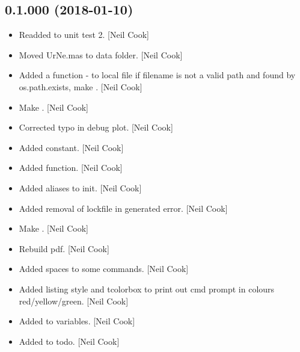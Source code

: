 \documentclass[a4paper,10pt,english]{report}
\begin{document}
\subsection{0.1.000 (2018-01-10)}
\label{\detokenize{misc/changelog:id504}}\begin{itemize}
\item {} 
Readded  to unit test 2. {[}Neil Cook{]}

\item {} 
Moved UrNe.mas to data folder. {[}Neil Cook{]}

\item {} 
Added a  function - to local file if filename is not a
valid path and found by os.path.exists, make  .
{[}Neil Cook{]}

\item {} 
Make  . {[}Neil Cook{]}

\item {} 
Corrected typo in debug plot. {[}Neil Cook{]}

\item {} 
Added  constant. {[}Neil Cook{]}

\item {} 
Added  function. {[}Neil Cook{]}

\item {} 
Added aliases to init. {[}Neil Cook{]}

\item {} 
Added removal of lockfile in generated error. {[}Neil Cook{]}

\item {} 
Make  . {[}Neil Cook{]}

\item {} 
Rebuild pdf. {[}Neil Cook{]}

\item {} 
Added spaces to some commands. {[}Neil Cook{]}

\item {} 
Added listing style and tcolorbox to print out cmd prompt in colours
red/yellow/green. {[}Neil Cook{]}

\item {} 
Added to variables. {[}Neil Cook{]}

\item {} 
Added to todo. {[}Neil Cook{]}


\end{itemize}
\end{document}
